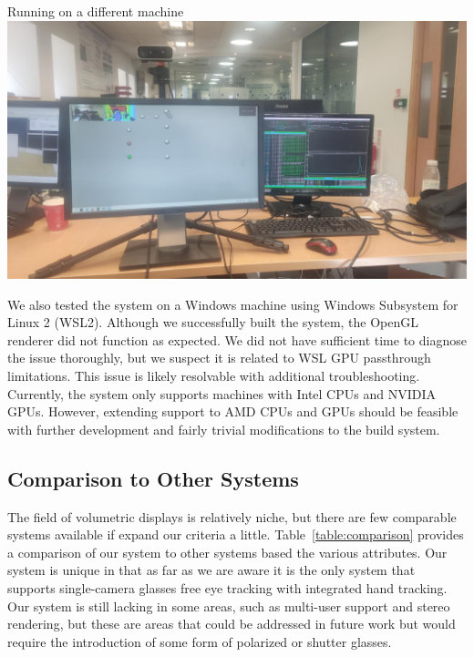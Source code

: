 \begin{figureBox}[label={fig:other-machine}, width=0.7\linewidth]{Running on a different machine}
	\includegraphics[width=1.0\linewidth]{./evaluation/figures/other-device.jpeg}
\end{figureBox}

We also tested the system on a Windows machine using Windows Subsystem for Linux 2 (WSL2). Although we successfully built the system, the OpenGL renderer did not function as expected. We did not have sufficient time to diagnose the issue thoroughly, but we suspect it is related to WSL GPU passthrough limitations. This issue is likely resolvable with additional troubleshooting. \\

Currently, the system only supports machines with Intel CPUs and NVIDIA GPUs. However, extending support to AMD CPUs and GPUs should be feasible with further development and fairly trivial modifications to the build system.

\subsection{Comparison to Other Systems}

The field of volumetric displays is relatively niche, but there are few comparable systems available if expand our criteria a little. Table~\ref{table:comparison} provides a comparison of our system to other systems based the various attributes. Our system is unique in that as far as we are aware it is the only system that supports single-camera glasses free eye tracking with integrated hand tracking. Our system is still lacking in some areas, such as multi-user support and stereo rendering, but these are areas that could be addressed in future work but would require the introduction of some form of polarized or shutter glasses.

